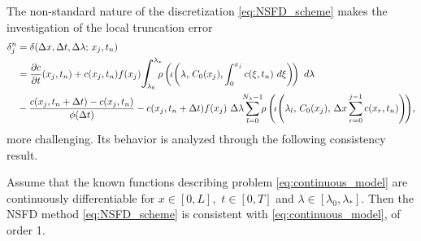 \documentclass[a4paper, UKenglish, numberwithinsect, thm-restate]{tgdk-v2021}
\begin{document}
The non-standard nature of the discretization \eqref{eq:NSFD_scheme} makes the investigation of the local truncation error
\begin{equation}\label{eq:local_error}
    \begin{split}
        \delta_j^n&=\delta(\Delta x, \Delta t, \Delta \lambda; \,  x_j,t_n) \\ 
        &=\displaystyle\dfrac{\partial c}{\partial t}(x_j,t_n)+ c(x_j,t_n) f(x_j)\scalebox{1.3}{$\displaystyle\int$}_{\!\!\!\!\! \lambda_{0}}^{\lambda_{*}} \!\!\! \rho\left(\! \iota \!\left(\lambda,\, C_0(x_j), \int_0^{x_j}    c(\xi,t_n)  \ d\xi\right)\!\right) \ d\lambda \\
        &- \dfrac{c(x_j,t_{n}+\Delta t)-c(x_j,t_{n})}{\phi(\Delta t)} - c(x_j,t_{n}+\Delta t) f(x_j) \ \Delta \lambda \!\! \sum_{l=0} ^{N_\lambda-1} \!\! \rho\left( \! \iota \! \left(\lambda_l,\, C_0(x_j) ,\, \Delta x \sum_{r=0}^{j-1}c(x_r,t_{n}) \right)\!\right) \! ,
    \end{split}
\end{equation}
more challenging. Its behavior is analyzed through the following consistency result.

\begin{lemma}\label{lemma:NSFD_Cons}
    Assume that the known functions describing problem \eqref{eq:continuous_model} are continuously differentiable for $x\in [0,L],$ $t \in [0,T]$ and $\lambda \in [\lambda_{0},\lambda_{*}].$ Then the NSFD method \eqref{eq:NSFD_scheme} is consistent with \eqref{eq:continuous_model}, of order 1. 
\end{lemma}
\end{document}
